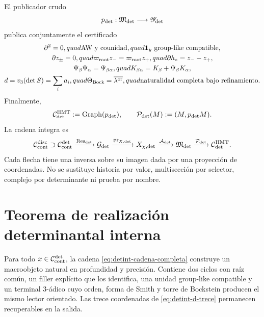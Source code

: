 El publicador crudo
\begin{equation}\label{eq:detint-publicador-crudo}
 p_{\rm det}:\mathfrak M_{\rm det}\longrightarrow\mathscr Y_{\rm det}
\end{equation}
publica conjuntamente el certificado
\begin{equation}\label{eq:detint-certificado-publicado}
\begin{gathered}
 \partial^2=0,quad \text{AW y counidad},quad
 \mathbf1_y\text{ group-like compatible},\\
 \partial z_\pm=0,quad
 \varpi_{\rm root}z_-=\varpi_{\rm root}z_+,quad
 \partial h_*=z_--z_+,\\
 \Psi_\beta\Psi_\alpha=\Psi_{\beta\alpha},quad
 K_{\beta\alpha}=K_\beta+\Psi_\beta K_\alpha,\\
 d=v_3(\det S)=\sum_i a_i,quad
 \Theta_{\rm Bock}=\overline{\lambda^{\rm or}},quad
 \text{naturalidad completa bajo refinamiento}.
\end{gathered}
\end{equation}
Finalmente,
\begin{equation}\label{eq:detint-graph-p}
 \mathcal C_{\rm det}^{\rm HMT}:=\operatorname{Graph}(p_{\rm det}),
 \qquad
 \mathcal P_{\rm det}(M):=(M,p_{\rm det}M).
\end{equation}
La cadena íntegra es
\begin{equation}\label{eq:detint-cadena-completa}
 \mathcal C_{\rm cont}^{\rm disc}\supset
 \mathcal C_{\rm cont}^{\rm det}
 \xrightarrow{\operatorname{Res}_{\rm det}}\mathcal G_{\rm det}
 \xrightarrow{\operatorname{pr}_{X,{\rm det}}}X_{\chi,{\rm det}}
 \xrightarrow{\mathcal A_{\rm det}}\mathfrak M_{\rm det}
 \xrightarrow{\mathcal P_{\rm det}}\mathcal C_{\rm det}^{\rm HMT}.
\end{equation}
Cada flecha tiene una inversa sobre su imagen dada por una proyección de
coordenadas. No se sustituye historia por valor, multisección por selector,
complejo por determinante ni prueba por nombre.

\section{Teorema de realización determinantal interna}

\begin{theorem}
\label{thm:detint-realizacion}
Para todo \(x\in\mathcal C_{\rm cont}^{\rm det}\), la cadena
\eqref{eq:detint-cadena-completa} construye un macroobjeto natural en
profundidad y precisión. Contiene dos ciclos con raíz común, un filler
explícito que los identifica, una unidad group-like compatible y un terminal
\(3\)-ádico cuyo orden, forma de Smith y torre de Bockstein producen el mismo
lector orientado. Las trece coordenadas de \eqref{eq:detint-d-trece}
permanecen recuperables en la salida.
\end{theorem}


